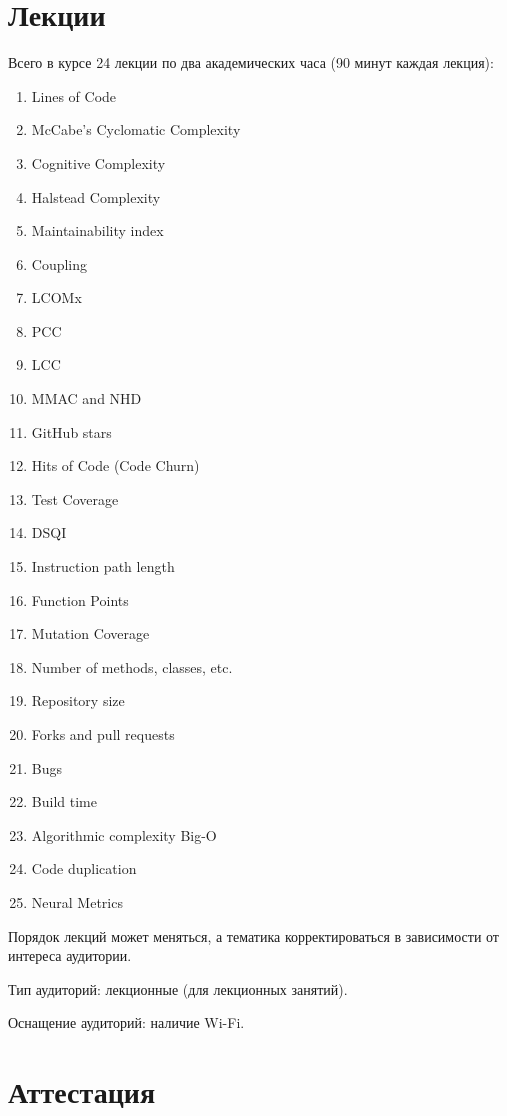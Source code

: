 \documentclass[nobrand,anonymous,nodate,nosecurity]{huawei}
\begin{document}
\section{Лекции}

Всего в курсе 24 лекции по два академических часа (90 минут каждая лекция):
\begin{enumerate}
    \setlength\itemsep{0em}
    \item Lines of Code
    \item McCabe's Cyclomatic Complexity
    \item Cognitive Complexity
    \item Halstead Complexity
    \item Maintainability index
    \item Coupling
    \item LCOMx
    \item PCC
    \item LCC
    \item MMAC and NHD
    \item GitHub stars
    \item Hits of Code (Code Churn)
    \item Test Coverage
    \item DSQI
    \item Instruction path length
    \item Function Points
    \item Mutation Coverage
    \item Number of methods, classes, etc.
    \item Repository size
    \item Forks and pull requests
    \item Bugs
    \item Build time
    \item Algorithmic complexity Big-O
    \item Code duplication
    \item Neural Metrics
\end{enumerate}

Порядок лекций может меняться, а тематика корректироваться в зависимости от интереса аудитории.

Тип аудиторий: лекционные (для лекционных занятий).

Оснащение аудиторий: наличие Wi-Fi.

\section{Аттестация}
\end{document}
